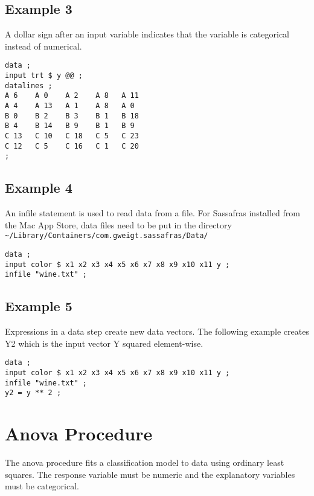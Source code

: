 \documentclass[12pt]{article}
\begin{document}
\subsection*{Example 3}

A dollar sign after an input variable indicates that the variable
is categorical instead of numerical.

{\scriptsize\begin{verbatim}
data ;
input trt $ y @@ ;
datalines ;
A 6    A 0    A 2    A 8   A 11
A 4    A 13   A 1    A 8   A 0
B 0    B 2    B 3    B 1   B 18
B 4    B 14   B 9    B 1   B 9
C 13   C 10   C 18   C 5   C 23
C 12   C 5    C 16   C 1   C 20
;
\end{verbatim}}

\subsection*{Example 4}

An infile statement is used to read data from a file.
For Sassafras installed from the Mac App Store,
data files need to be put in the directory
{\scriptsize\verb$~/Library/Containers/com.gweigt.sassafras/Data/$}

{\scriptsize\begin{verbatim}
data ;
input color $ x1 x2 x3 x4 x5 x6 x7 x8 x9 x10 x11 y ;
infile "wine.txt" ;
\end{verbatim}}

\subsection*{Example 5}

Expressions in a data step create new data vectors.
The following example creates Y2 which is the input
vector Y squared element-wise.

{\scriptsize\begin{verbatim}
data ;
input color $ x1 x2 x3 x4 x5 x6 x7 x8 x9 x10 x11 y ;
infile "wine.txt" ;
y2 = y ** 2 ;
\end{verbatim}}

\newpage

\section{Anova Procedure}

The anova procedure fits a classification model
to data using ordinary least squares.
The response variable must be numeric and the
explanatory variables must be categorical.
\end{document}
